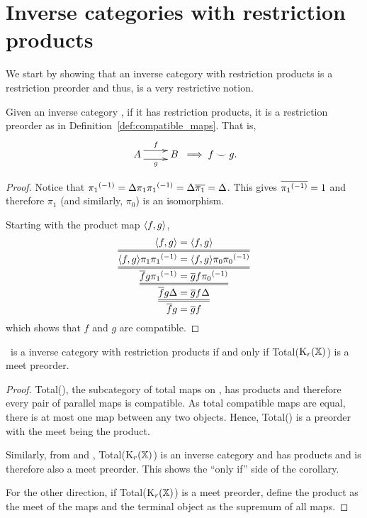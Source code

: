 \section{Inverse categories with restriction products} %
\label{sec:inverse_categories_with_restriction_products}
We start by showing that an inverse category with restriction products is a restriction preorder
and thus, is a very restrictive notion.
\begin{proposition}\label{prop:an_inverse_category_with_products_is_a_restriction_preorder}
  Given an inverse category \X, if it has restriction products, it is a restriction preorder as in
  Definition~\ref{def:compatible_maps}. That is,
  \[
    \xymatrix {
      A  \ar@<1ex>[r]^{f} \ar@<-1ex>[r]_{g} &B
    }
    \implies f \compatible g.
  \]
\end{proposition}
\begin{proof}
  Notice that $ {\pi_1}^{(-1)}  = \Delta \pi_1 {\pi_1}^{(-1)} =\Delta \overline{\pi_1} = \Delta$.
  This gives $\overline{{\pi_1}^{(-1)}} = 1$ and therefore $\pi_1$ (and similarly, $\pi_0$) is an
  isomorphism.

  Starting with the product map $\langle f,g\rangle$,
  \[
    \infer={\restr{f}g = \restr{g}f}
    {\infer={\restr{f}g\Delta = \restr{g}f\Delta}
    {\infer={\restr{f}g\inv{\pi_1} = \restr{g}f\inv{\pi_0}}
    {\infer={\<f,g\>\pi_1 \inv{\pi_1} = \<f,g\>\pi_0 \inv{\pi_0}}
    {\<f,g\> = \<f,g\>}}}}
  \]
  which shows that $f$ and $g$ are compatible.
\end{proof}

\begin{corollary}
  \X\ is a inverse category with restriction products if and only if Total($\text{K}_{r}(\mathbb{X})$) is a meet preorder.
\end{corollary}

\begin{proof}
  Total(\X), the subcategory of total maps on \X, has products and therefore every pair of parallel
  maps is compatible. As total compatible maps are equal, there is at most
  one map between any two objects. Hence, Total(\X) is a preorder with the meet being the product.

  Similarly, from \cite{cockett2002:restcategories1} and \cite{cockettlack2004:restcategories3},
  Total($\text{K}_{r}(\mathbb{X})$) is an inverse category and has products and is therefore also a meet
  preorder. This shows the ``only if'' side of the corollary.

  For the other direction, if Total($\text{K}_{r}(\mathbb{X})$) is a meet preorder, define the product as the
  meet of the maps and the terminal object as the supremum of all maps.
\end{proof}

